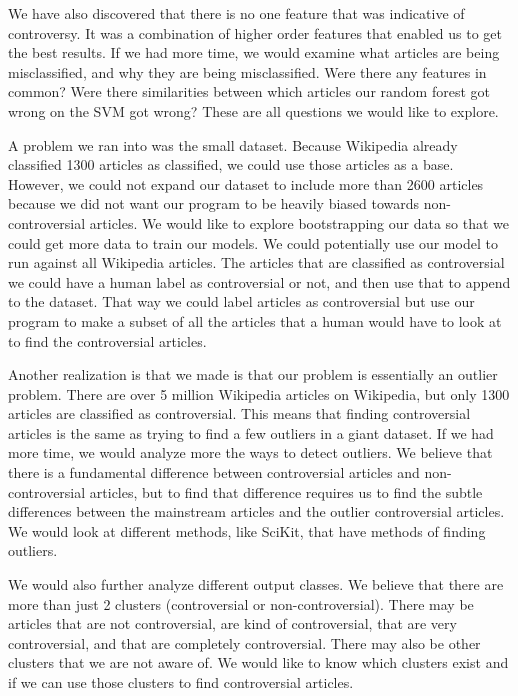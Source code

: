 \documentclass{article}
\begin{document}
We have also discovered that there is no one feature that was indicative of controversy. 
It was a combination of higher order features that enabled us to get the best results. 
If we had more time, we would examine what articles are being misclassified, and why they are being misclassified. 
Were there any features in common? 
Were there similarities between which articles our random forest got wrong on the SVM got wrong? 
These are all questions we would like to explore. 

A problem we ran into was the small dataset. 
Because Wikipedia already classified 1300 articles as classified, we could use those articles as a base. 
However, we could not expand our dataset to include more than 2600 articles because we did not want our program to be heavily biased towards non-controversial articles. 
We would like to explore bootstrapping our data so that we could get more data to train our models.
We could potentially use our model to run against all Wikipedia articles. 
The articles that are classified as controversial we could have a human label as controversial or not, and then use that to append to the dataset. 
That way we could label articles as controversial but use our program to make a subset of all the articles that a human would have to look at to find the controversial articles.

Another realization is that we made is that our problem is essentially an outlier problem. 
There are over 5 million Wikipedia articles on Wikipedia, but only 1300 articles are classified as controversial. 
This means that finding controversial articles is the same as trying to find a few outliers in a giant dataset. 
If we had more time, we would analyze more the ways to detect outliers.
We believe that there is a fundamental difference between controversial articles and non-controversial articles, but to find that difference requires us to find the subtle differences between the mainstream articles and the outlier controversial articles.
We would look at different methods, like SciKit, that have methods of finding outliers. 

We would also further analyze different output classes. 
We believe that there are more than just 2 clusters (controversial or non-controversial). 
There may be articles that are not controversial, are kind of controversial, that are very controversial, and that are completely controversial. 
There may also be other clusters that we are not aware of. We would like to know which clusters exist and if we can use those clusters to find controversial articles.
\end{document}
